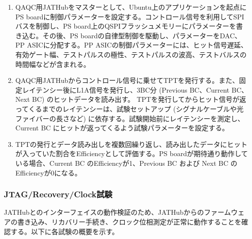 \begin{enumerate}
    \item QAQC用JATHubをマスターとして、Ubuntu上のアプリケーションを起点にPS boardに制御パラメーターを設定する。コントロール信号を利用してSPIバスを制御し、PS board上のQSPIフラッシュメモリーにパラメーターを書き込む。その後、PS boardの自律型制御を駆動し、パラメーターをDAC、PP ASICに分配する。PP ASICの制御パラメーターには、ヒット信号遅延、有効ゲート幅、テストパルスの極性、テストパルスの波高、テストバルスの時間幅などが含まれる。
    \baselineskip

    \item QAQC用JATHubからコントロール信号に乗せてTPTを発行する。また、固定レイテンシー後にL1A信号を発行し、3BC分 (Previous BC、Current BC、Next BC) のヒットデータを読み出す。
    TPTを発行してからヒット信号が返ってくるまでのレイテンシーは、試験セットアップ (シグナルケーブルや光ファイバーの長さなど) に依存する。試験開始前にレイテンシーを測定し、Current BC にヒットが返ってくるよう試験パラメーターを設定する。
    \baselineskip

    \item TPTの発行とデータ読み出しを複数回繰り返し、読み出したデータにヒットが入っていた割合をEfficiencyとして評価する。PS boardが期待通り動作している場合、Current BC のEfficiencyが1、Previous BC および Next BC のEfficiencyが0になる。
    \baselineskip

\end{enumerate}



\subsubsection{JTAG/Recovery/Clock試験}
\baselineskip
\label{subsubsec_jtag}
JATHubとのインターフェイスの動作検証のため、JATHubからのファームウェアの書き込み、リカバリー手続き、クロック位相測定が正常に動作することを確認する。以下に各試験の概要を示す。

